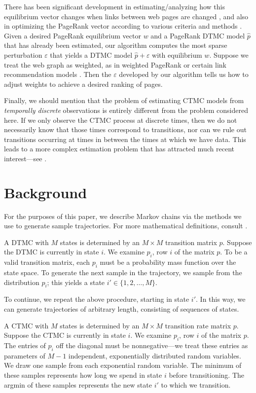 \documentclass[review,letterpaper,11pt]{elsarticle}
\begin{document}
There has been significant development in estimating/analyzing how this equilibrium vector changes when links between web pages are changed \cite{NZJijcai01, langville2006updating, Chartier2011}, and also in optimizing the PageRank vector according to various criteria and methods \cite{fercoq2013ergodic, fercoq2014perron, csaji2014pagerank}.  Given a desired PageRank equilibrium vector $w$ and a PageRank DTMC model $\widehat{p}$ that has already been estimated, our algorithm computes the most sparse perturbation $\varepsilon$ that yields a DTMC model $\widehat{p} + \varepsilon$ with equilibrium $w$.  Suppose we treat the web graph as weighted, as in weighted PageRank \cite{Gleich2015} or certain link recommendation models \cite{backstrom2011supervised}.  Then the $\varepsilon$ developed by our algorithm tells us how to adjust weights to achieve a desired ranking of pages.

Finally, we should mention that the problem of estimating CTMC models from \emph{temporally discrete} observations is entirely different from the problem considered here.  If we only observe the CTMC process at discrete times, then we do not necessarily know that those times correspond to transitions, nor can we rule out transitions occurring at times in between the times at which we have data.  This leads to a more complex estimation problem that has attracted much recent interest---see \cite{Schutte2007, Rao2013, Hajiaghayi2014, Crawford2014}.

\section{Background}
\label{sect:background}
For the purposes of this paper, we describe Markov chains via the methods we use to generate sample trajectories.  For more mathematical definitions, consult \cite{Lawler}.

A DTMC with $M$ states is determined by an $M \times M$ transition matrix $p$.  
Suppose the DTMC is currently in state $i$.  We examine $p_i$, row $i$ of the matrix $p$.  To be a valid transition matrix, each $p_i$ must be a probability mass function over the state space.  To generate the next sample in the trajectory, we sample from the distribution $p_i$; this yields a state $i' \in \{1, 2,  \ldots, M\}$.

To continue, we repeat the above procedure, starting in state $i'$.  In this way, we can generate trajectories of arbitrary length, consisting of sequences of states.

A CTMC with $M$ states is determined by an $M \times M$ transition rate matrix $p$.  Suppose the CTMC is currently in state $i$.  We examine $p_i$, row $i$ of the matrix $p$.  The entries of $p_i$ off the diagonal must be nonnegative---we treat these entries as parameters of $M-1$ independent, exponentially distributed random variables.  We draw one sample from each exponential random variable.  The minimum of these samples represents how long we spend in state $i$ before transitioning.  The argmin of these samples represents the new state $i'$ to which we transition.
\end{document}
